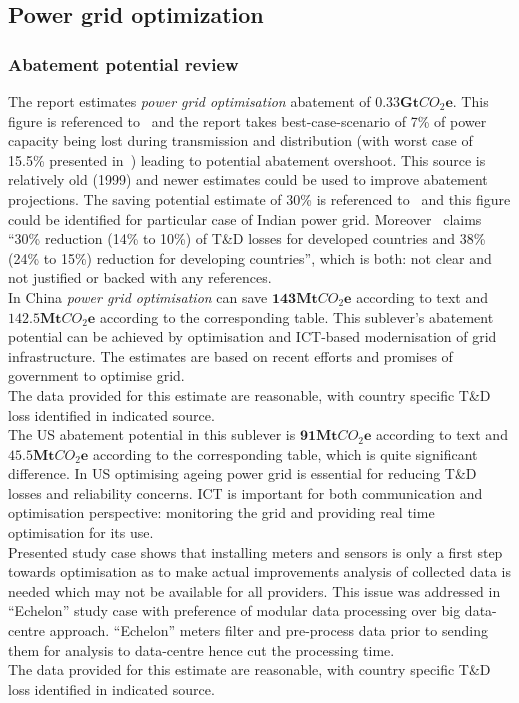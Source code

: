 \documentclass[11pt, twocolumn]{article}
\begin{document}
\subsection{Power grid optimization}
\subsubsection{Abatement potential review}
The report estimates \emph{power grid optimisation} abatement of $\mathbf{0.33Gt}CO_2\mathbf{e}$. This figure is referenced to~\citep{teri:td} and the report takes best-case-scenario of 7\% of power capacity being lost during transmission and distribution (with worst case of 15.5\% presented in~\citep{teri:td}) leading to potential abatement overshoot. This source is relatively old (1999) and newer estimates could be used to improve abatement projections. The saving potential estimate of 30\% is referenced to~\citep{webb2008smart} and this figure could be identified for particular case of Indian power grid. Moreover~\citep{webb2008smart} claims ``30\% reduction (14\% to 10\%) of T\&D losses for developed countries and 38\% (24\% to 15\%) reduction for developing countries'', which is both: not clear and not justified or backed with any references.\\

In China \emph{power grid optimisation} can save $\mathbf{143} \mathbf{Mt}CO_2\mathbf{e}$ according to text and $\mathbf{142.5} \mathbf{Mt}CO_2\mathbf{e}$ according to the corresponding table. This sublever's abatement potential can be achieved by optimisation and ICT-based modernisation of grid infrastructure. The estimates are based on recent efforts and promises of government to optimise grid.\\
The data provided for this estimate are reasonable, with country specific T\&D loss identified in indicated source.\\

The US abatement potential in this sublever is $\mathbf{91} \mathbf{Mt}CO_2\mathbf{e}$ according to text and $\mathbf{45.5} \mathbf{Mt}CO_2\mathbf{e}$ according to the corresponding table, which is quite significant difference. In US optimising ageing power grid is essential for reducing T\&D losses and reliability concerns. ICT is important for both communication and optimisation perspective: monitoring the grid and providing real time optimisation for its use.\\
Presented study case shows that installing meters and sensors is only a first step towards optimisation as to make actual improvements analysis of collected data is needed which may not be available for all providers. This issue was addressed in ``Echelon'' study case with preference of modular data processing over big data-centre approach. ``Echelon'' meters filter and pre-process data prior to sending them for analysis to data-centre hence cut the processing time.\\
The data provided for this estimate are reasonable, with country specific T\&D loss identified in indicated source.\\
\end{document}
